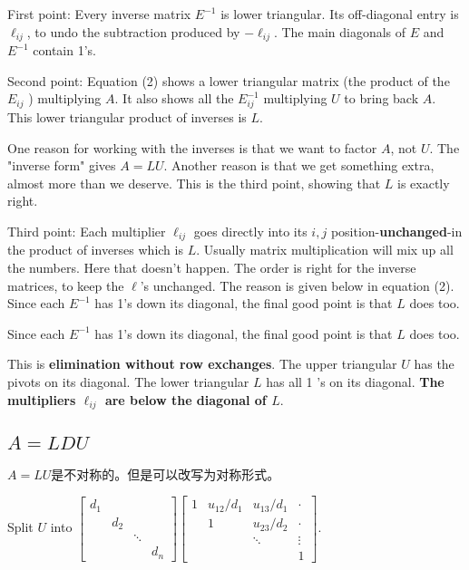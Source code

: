\begin{remark}
    First point: Every inverse matrix $ E^{-1} $ is lower triangular. Its off-diagonal entry is $ \ell_{i j} $, to undo the subtraction produced by $ -\ell_{i j} . $ The main diagonals of $ E $ and $ E^{-1} $ contain 1's.
\end{remark}

\begin{remark}
    Second point: Equation (2) shows a lower triangular matrix (the product of the $ E_{i j} $ ) multiplying $ A . $ It also shows all the $ E_{i j}^{-1} $ multiplying $ U $ to bring back $ A . $ This lower triangular product of inverses is $ L $.
\end{remark}

One reason for working with the inverses is that we want to factor $ A $, not $ U $. The "inverse form" gives $ A=L U $. Another reason is that we get something extra, almost more than we deserve. This is the third point, showing that $ L $ is exactly right.

\begin{remark}
    Third point: Each multiplier $ \ell_{i j} $ goes directly into its $ i, j $ position-\textbf{unchanged}-in the product of inverses which is $ L $. Usually matrix multiplication will mix up all the numbers. Here that doesn't happen. The order is right for the inverse matrices, to keep the $ \ell $'s unchanged. The reason is given below in equation (2).
Since each $ E^{-1} $ has 1's down its diagonal, the final good point is that $ L $ does too.
\end{remark}

Since each $ E^{-1} $ has 1's down its diagonal, the final good point is that $ L $ does too.

This is \textbf{elimination without row exchanges}. The upper triangular $ U $ has the pivots on its diagonal. The lower triangular $ L $ has all 1 's on its diagonal. \textbf{The multipliers $ \ell_{i j} $ are below the diagonal of $ L $}.

\subsection{$A = LDU$}

$A=LU$是不对称的。但是可以改写为对称形式。

Split $ U $ into $ \left[\begin{array}{cccc}d_{1} & & & \\ & d_{2} & & \\ & & \ddots & \\ & & & d_{n}\end{array}\right]\left[\begin{array}{cccc}1 & u_{12} / d_{1} & u_{13} / d_{1} & \cdot \\ & 1 & u_{23} / d_{2} & \cdot \\ & & \ddots & \vdots \\ & & & 1\end{array}\right] $.

